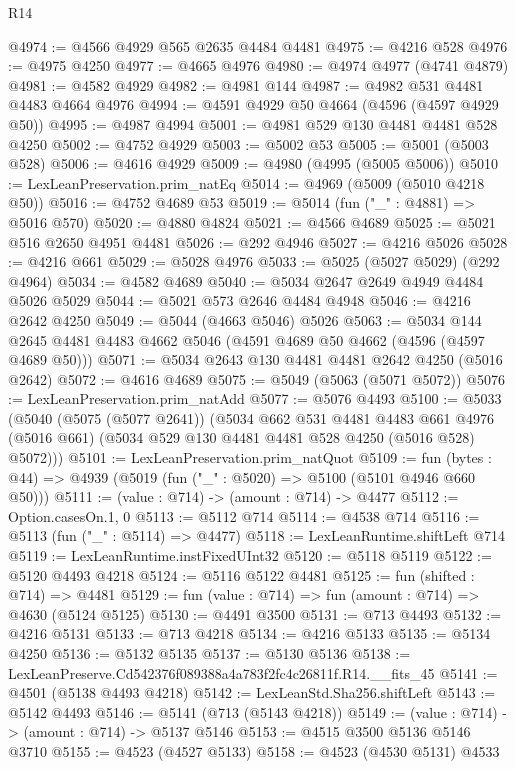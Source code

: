 \begin{lexlean}{R14}
\begin{coremodule}
@4974 := @4566 @4929 @565 @2635 @4484 @4481
@4975 := @4216 @528
@4976 := @4975 @4250
@4977 := @4665 @4976
@4980 := @4974 @4977 (@4741 @4879)
@4981 := @4582 @4929
@4982 := @4981 @144
@4987 := @4982 @531 @4481 @4483 @4664 @4976
@4994 := @4591 @4929 @50 @4664 (@4596 (@4597 @4929 @50))
@4995 := @4987 @4994
@5001 := @4981 @529 @130 @4481 @4481 @528 @4250
@5002 := @4752 @4929
@5003 := @5002 @53
@5005 := @5001 (@5003 @528)
@5006 := @4616 @4929
@5009 := @4980 (@4995 (@5005 @5006))
@5010 := LexLeanPreservation.prim_natEq
@5014 := @4969 (@5009 (@5010 @4218 @50))
@5016 := @4752 @4689 @53
@5019 := @5014 (fun ("_" : @4881) => @5016 @570)
@5020 := @4880 @4824
@5021 := @4566 @4689
@5025 := @5021 @516 @2650 @4951 @4481
@5026 := @292 @4946
@5027 := @4216 @5026
@5028 := @4216 @661
@5029 := @5028 @4976
@5033 := @5025 (@5027 @5029) (@292 @4964)
@5034 := @4582 @4689
@5040 := @5034 @2647 @2649 @4949 @4484 @5026 @5029
@5044 := @5021 @573 @2646 @4484 @4948
@5046 := @4216 @2642 @4250
@5049 := @5044 (@4663 @5046) @5026
@5063 := @5034 @144 @2645 @4481 @4483 @4662 @5046 (@4591 @4689 @50 @4662 (@4596 (@4597 @4689 @50)))
@5071 := @5034 @2643 @130 @4481 @4481 @2642 @4250 (@5016 @2642)
@5072 := @4616 @4689
@5075 := @5049 (@5063 (@5071 @5072))
@5076 := LexLeanPreservation.prim_natAdd
@5077 := @5076 @4493
@5100 := @5033
    (@5040
      (@5075 (@5077 @2641))
      (@5034
        @662
        @531
        @4481
        @4483
        @661
        @4976
        (@5016 @661)
        (@5034 @529 @130 @4481 @4481 @528 @4250 (@5016 @528) @5072)))
@5101 := LexLeanPreservation.prim_natQuot
@5109 := fun (bytes : @44) => @4939 (@5019 (fun ("_" : @5020) => @5100 (@5101 @4946 @660 @50)))
@5111 := (value : @714) -> (amount : @714) -> @4477
@5112 := Option.casesOn.{1, 0}
@5113 := @5112 @714
@5114 := @4538 @714
@5116 := @5113 (fun ("_" : @5114) => @4477)
@5118 := LexLeanRuntime.shiftLeft @714
@5119 := LexLeanRuntime.instFixedUInt32
@5120 := @5118 @5119
@5122 := @5120 @4493 @4218
@5124 := @5116 @5122 @4481
@5125 := fun (shifted : @714) => @4481
@5129 := fun (value : @714) => fun (amount : @714) => @4630 (@5124 @5125)
@5130 := @4491 @3500
@5131 := @713 @4493
@5132 := @4216 @5131
@5133 := @713 @4218
@5134 := @4216 @5133
@5135 := @5134 @4250
@5136 := @5132 @5135
@5137 := @5130 @5136
@5138 := LexLeanPreserve.Cd542376f089388a4a783f2fc4c26811f.R14.__fits_45
@5141 := @4501 (@5138 @4493 @4218)
@5142 := LexLeanStd.Sha256.shiftLeft
@5143 := @5142 @4493
@5146 := @5141 (@713 (@5143 @4218))
@5149 := (value : @714) -> (amount : @714) -> @5137 @5146
@5153 := @4515 @3500 @5136 @5146 @3710
@5155 := @4523 (@4527 @5133)
@5158 := @4523 (@4530 @5131) @4533

\end{coremodule}
\end{lexlean}
